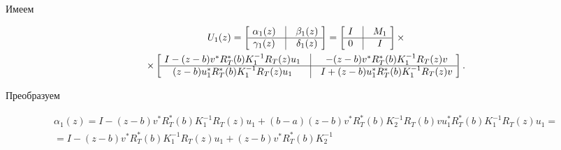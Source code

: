 \begin{pf}


Имеем


\begin{multline*}


U_1(z) = \left[\ \begin{matrix}


\alpha_1 (z) & \vline & \beta_1 (z) \\


\hline


\gamma_1 (z) & \vline & \delta_1 (z)


\end{matrix}\ \right]


=\left[\ \begin{matrix}


I & \vline & M_1 \\


\hline


0 & \vline & I


\end{matrix}\ \right]


\times \\


%


\times \left[\ \begin{matrix}


I-(z-b)v^{*}R_T^*(b)K_1^{-1}R_T(z)u_1 & \vline &


-(z-b)v^{*}R_T^*(b)K_1^{-1}R_T(z)v \\


\hline


(z-b)u_1^{*}R_T^*(b)K_1^{-1}R_T(z)u_1 & \vline &


I+(z-b)u_1^{*}R_T^*(b)K_1^{-1}R_T(z)v


\end{matrix}\ \right].


\end{multline*}


Преобразуем


\begin{multline*}


\alpha_1(z)=I-(z-b)v^{*}R_T^*(b)K_1^{-1}R_T(z)u_1


+(b-a)(z-b)v^{*}R_T^*(b)K_2^{-1}R_T(b)vu_1^{*}R_T^*(b)K_1^{-1}R_T(z)u_1=\\


%


=I-(z-b)v^{*}R_T^*(b)K_1^{-1}R_T(z)u_1


+(z-b)v^{*}R_T^*(b)K_2^{-1}



\end{multline*}
\end{pf}
